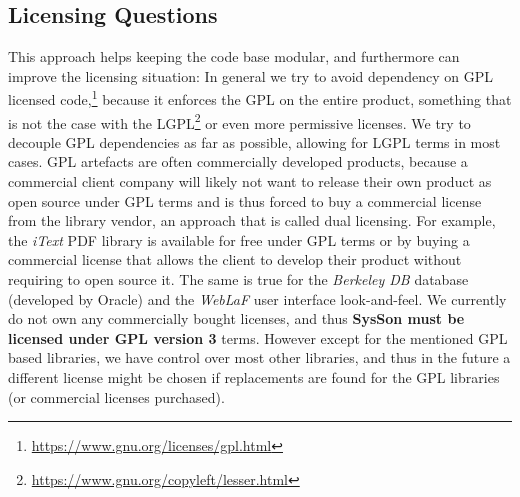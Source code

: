 \documentclass[11pt,a4paper]{article}
\newcommand{\software}[1]{\textit{#1}}
\newcommand{\sysson}[0]{SysSon}
\begin{document}
\subsection{Licensing Questions}

This approach helps keeping the code base modular, and furthermore can improve the licensing situation: In general we try to avoid dependency on GPL licensed code,\footnote{\url{https://www.gnu.org/licenses/gpl.html}} because it enforces the GPL on the entire product, something that is not the case with the LGPL\footnote{\url{https://www.gnu.org/copyleft/lesser.html}} or even more permissive licenses. We try to decouple GPL dependencies as far as possible, allowing for LGPL terms in most cases. GPL artefacts are often commercially developed products, because a commercial client company will likely not want to release their own product as open source under GPL terms and is thus forced to buy a commercial license from the library vendor, an approach that is called dual licensing. For example, the \software{iText} PDF library is available for free under GPL terms or by buying a commercial license that allows the client to develop their product without requiring to open source it. The same is true for the \software{Berkeley DB} database (developed by Oracle) and the \software{WebLaF} user interface look-and-feel. We currently do not own any commercially bought licenses, and thus \textbf{\sysson{} must be licensed under GPL version 3} terms. However except for the mentioned GPL based libraries, we have control over most other libraries, and thus in the future a different license might be chosen if replacements are found for the GPL libraries (or commercial licenses purchased).
\end{document}
